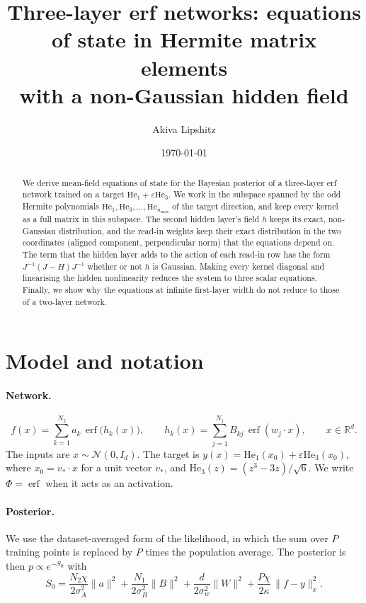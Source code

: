 \documentclass[11pt,a4paper]{article}
\title{Three-layer erf networks: equations of state in Hermite matrix elements\\
\large with a non-Gaussian hidden field}
\author{Akiva Lipshitz}
\date{\today}
\newcommand{\erf}{\operatorname{erf}}
\newcommand{\He}{\mathrm{He}}
\begin{document}
\maketitle

\begin{abstract}
We derive mean-field equations of state for the Bayesian posterior of a three-layer erf network trained on a target
$\He_1+\varepsilon\He_3$.
We work in the subspace spanned by the odd Hermite polynomials $\He_1,\He_3,\dots,\He_{n_{\max}}$ of the target direction, and keep every kernel as a full matrix in this subspace.
The second hidden layer's field $h$ keeps its exact, non-Gaussian distribution, and the read-in weights keep their exact distribution
in the two coordinates (aligned component, perpendicular norm) that the equations depend on.
The term that the hidden layer adds to the action of each read-in row has the form $J^{-1}(J-H)J^{-1}$ whether or not $h$ is Gaussian.
Making every kernel diagonal and linearising the hidden nonlinearity reduces the system to three scalar equations.
Finally, we show why the equations at infinite first-layer width do not reduce to those of a two-layer network.
\end{abstract}

\section{Model and notation}
\paragraph{Network.}
\begin{equation}
  f(x)=\sum_{k=1}^{N_2}a_k\,\erf\big(h_k(x)\big),\qquad
  h_k(x)=\sum_{j=1}^{N_1}B_{kj}\,\erf(w_j\cdot x),\qquad x\in\mathbb R^d .
  \label{eq:net}
\end{equation}
The inputs are $x\sim\mathcal N(0,I_d)$.
The target is $y(x)=\He_1(x_0)+\varepsilon\He_3(x_0)$, where $x_0=v_*\cdot x$ for a unit vector $v_*$, and
$\He_3(z)=(z^3-3z)/\sqrt6$.
We write $\Phi=\erf$ when it acts as an activation.

\paragraph{Posterior.}
We use the dataset-averaged form of the likelihood, in which the sum over $P$ training points is replaced by $P$ times the population
average. The posterior is then $p\propto e^{-S_0}$ with
\begin{equation}
  S_0=\frac{N_2\chi}{2\sigma_A^2}\|a\|^2+\frac{N_1}{2\sigma_B^2}\|B\|^2+\frac{d}{2\sigma_w^2}\|W\|^2
  +\frac{P\chi}{2\kappa}\,\|f-y\|_x^2 .
  \label{eq:S0}
\end{equation}
\end{document}
